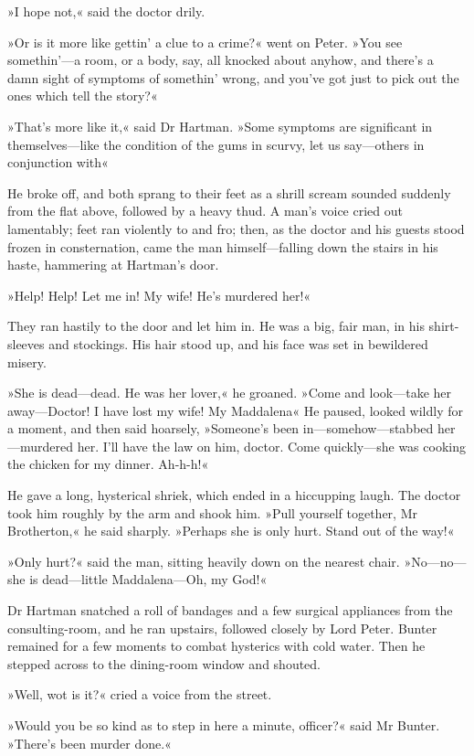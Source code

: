 »I hope not,« said the doctor drily.

»Or is it more like gettin' a clue to a crime?« went on Peter. »You see somethin'—a room, or a body, say, all knocked about anyhow, and there's a damn sight of symptoms of somethin' wrong, and you've got just to pick out the ones which tell the story?«

»That's more like it,« said Dr Hartman. »Some symptoms are significant in themselves—like the condition of the gums in scurvy, let us say—others in conjunction with\longdash«

He broke off, and both sprang to their feet as a shrill scream sounded suddenly from the flat above, followed by a heavy thud. A man's voice cried out lamentably; feet ran violently to and fro; then, as the doctor and his guests stood frozen in consternation, came the man himself—falling down the stairs in his haste, hammering at Hartman's door.

»Help! Help! Let me in! My wife! He's murdered her!«

They ran hastily to the door and let him in. He was a big, fair man, in his shirt-sleeves and stockings. His hair stood up, and his face was set in bewildered misery.

»She is dead—dead. He was her lover,« he groaned. »Come and look—take her away—Doctor! I have lost my wife! My Maddalena\longdash« He paused, looked wildly for a moment, and then said hoarsely, »Someone's been in—somehow—stabbed her—murdered her. I'll have the law on him, doctor. Come quickly—she was cooking the chicken for my dinner. Ah-h-h!«

He gave a long, hysterical shriek, which ended in a hiccupping laugh. The doctor took him roughly by the arm and shook him. »Pull yourself together, Mr Brotherton,« he said sharply. »Perhaps she is only hurt. Stand out of the way!«

»Only hurt?« said the man, sitting heavily down on the nearest chair. »No—no—she is dead—little Maddalena—Oh, my God!«

Dr Hartman snatched a roll of bandages and a few surgical appliances from the consulting-room, and he ran upstairs, followed closely by Lord Peter. Bunter remained for a few moments to combat hysterics with cold water. Then he stepped across to the dining-room window and shouted.

»Well, wot is it?« cried a voice from the street.

»Would you be so kind as to step in here a minute, officer?« said Mr Bunter. »There's been murder done.«

